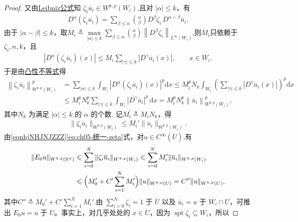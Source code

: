 \documentclass[../../main.tex]{subfiles}
\begin{document}
\begin{proof}
又由\hyperref[theorem:ch05-弱导数性质]{Leibniz公式}知 $\zeta_i\overline{u}_i\in W^{k,p}(W_i)$,且对 $|\alpha|\leqslant k$，有
\begin{align*}
D^{\alpha}(\zeta_i\overline{u}_i)=\sum_{\beta\leqslant\alpha}\binom{\alpha}{\beta}D^{\beta}\zeta_i\,D^{\alpha-\beta}\overline{u}_i.
\end{align*}
由于 $|\alpha-\beta|\leqslant k$，取$M_i\triangleq \underset{\left| \alpha \right|\leqslant k}{\max}\sum_{\beta \leqslant \alpha}{\binom{\alpha}{\beta}}\left\| D^{\beta}\zeta _i \right\| _{L^{\infty}\left( W_i \right)}$,则$M_i$只依赖于 $\zeta_i,n,k$，且
\begin{align*}
|D^{\alpha}(\zeta_i\overline{u}_i)(x)|\leqslant M_i\sum_{|\gamma|\leqslant k}|D^{\gamma}\overline{u}_i(x)|,\qquad x\in W_i.
\end{align*}
于是由\hyperref[Basis of Analytics-proposition:凸性不等式]{凸性不等式}得
\begin{align*}
\left\| \zeta _i\overline{u}_i \right\| _{W^{k,p}\left( W_i \right)}^{p}&=\sum_{|\alpha |\leqslant k}{\int_{W_i}{\left| D^{\alpha}\left( \zeta _i\overline{u}_i \right) \left( x \right) \right|^p\mathrm{d}x}}\leqslant M_{i}^{p}N_k\int_{W_i}{\left( \sum_{\left| \gamma \right|\leqslant k}{\left| D^{\gamma}\overline{u}_i\left( x \right) \right|} \right) ^p\mathrm{d}x}
\\
&\leqslant M_{i}^{p}N_{k}^{p}\sum_{|\gamma |\leqslant k}{\int_{W_i}{|D^{\gamma}\overline{u}_i|^p\,\mathrm{d}x}}=M_{i}^{p}N_{k}^{p}\left\| \overline{u}_i \right\|_{W^{k,p}(W_i)}^{p},
\end{align*}
其中$N_k$ 为满足 $|\alpha|\leqslant k$ 的 $\alpha$ 的个数.
记$M_{i}^{\prime}\triangleq M_iN_k$，得
\begin{align}
\|\zeta_i\overline{u}_i\|_{W^{k,p}(W_i)}\leqslant M_i'\|\overline{u}_i\|_{W^{k,p}(W_i)}.
\label{eq:ch05-统一-zeta}
\end{align}
由\eqref{eqnhjNHJNJZZZ}\eqref{eq:ch05-统一-zeta}式，对$u\in C^{\infty}(\overline{U})$,有
\begin{align}
\|E_0u\|_{W^{k,p}(\mathbb{R}^{n})}
&\leqslant\sum_{i=0}^{N}\|\zeta_i\overline{u}_i\|_{W^{k,p}(W_i)}
\leqslant\sum_{i=0}^{N}M_i'\|\overline{u}_i\|_{W^{k,p}(W_i)}
\notag\\
&\leqslant\Big(M_0'+C'\sum_{i=1}^{N}M_i'\Big)\|u\|_{W^{k,p}(U)}
= C''\|u\|_{W^{k,p}(U)},
\label{eq:ch05-统一-smooth估计}
\end{align}
其中$C''\triangleq M_0'+C'\sum_{i=1}^{N}M_i'$.由 $\sum\limits_{i=0}^{N}\zeta_i=1$ 于 $\overline{U}$ 以及 $\overline{u}_i=u$ 于 $W_i\cap U$，可推出 $E_0u=u$ 于 $U$。事实上，对几乎处处的 $x\in U$，因为 $\operatorname{spt}\zeta_i\subseteq W_i$，所以

\end{proof}
\end{document}

